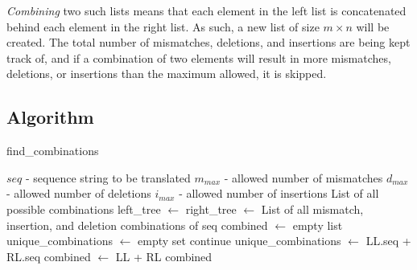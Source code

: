 \documentclass[12pt]{article}
\theoremstyle{definition}
\newcommand*\Let[2]{\State #1 $\gets$ #2}
\newcommand*\Returns[1]{\State \Return #1}
\begin{document}
\emph{Combining} two such lists means that each element in the left list is concatenated behind each element in the right list. As such, a new list of size $m \times n$ will be created. The total number of mismatches, deletions, and insertions are being kept track of, and if a combination of two elements will result in more mismatches, deletions, or insertions than the maximum allowed, it is skipped.

\subsection{Algorithm}

\begin{spacing}{0.8}
\begin{algorithm}[H]
	\caption{find\_combinations}
	\label{alg:divideandconquer}
  	\begin{algorithmic}[1]
    		\Require
    			\Statex $seq$ - sequence string to be translated
    			\Statex $m_{max}$ - allowed number of mismatches
    			\Statex $d_{max}$ - allowed number of deletions
    			\Statex $i_{max}$ - allowed number of insertions
    		\Ensure
    			\Statex List of all possible combinations
		\Statex
    			\Let{left\_tree}{} \label{alg:divide:leftT}
    			\Let{right\_tree}{} \label{alg:divide:rightT}
    		\Else
    			\Returns{List of all mismatch, insertion, and deletion combinations of seq} \label{alg:divide:conquer}
    		\EndIf
    		\State
    		\Let{combined}{empty list}
    		\Let{unique\_combinations}{empty set}
    		 
    			 \label{alg:divide:inner} 
    				 \label{alg:divide:invariant1}
    					\State continue
    				\EndIf
    				 \label{alg:divide:invariant2}
    					\Let{unique\_combinations}{LL.seq + RL.seq}
    					\Let{combined}{LL + RL}
    				\EndIf
    			\EndFor
    		\EndFor
    		\Returns{combined}
    		\EndFunction
  	\end{algorithmic}
\end{algorithm}
\end{spacing}
\end{document}
